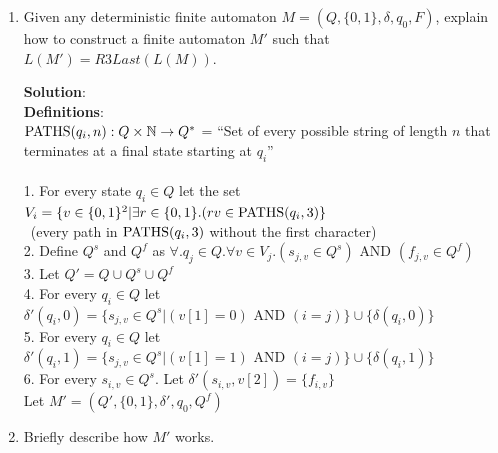\documentclass[11pt]{article}
\def\nats {{\mathbb N}}
\newcommand{\And}{\mbox{ AND }}
\begin{document}
\begin{enumerate}
\item
\begin{question}
Given any deterministic finite automaton $M=(Q,\{0,1\},\delta, q_0,F)$, explain how to construct
a finite automaton $M'$ such that $L(M') = R3Last(L(M))$.
\end{question}

\begin{solution}
{\bf Solution}:\\
{\bf Definitions}:\\
${\rm PATHS}(q_i, n): Q\times\nats\rightarrow Q^* $ = ``Set of every possible string of length $n$ that terminates at a final state starting at $q_i$''\\\\
1. For every state $q_i\in Q$ let the set $V_i=\{v\in \{0,1\}^2|\exists r\in \{0,1\}.(rv\in {\rm PATHS}(q_i, 3)\} $ \\
\null\quad  \ (every path in ${\rm PATHS}(q_i, 3)$ without the first character)\\
2. Define $Q^{s}$ and $Q^{f}$ as $\forall.q_j\in Q.\forall v\in V_j. (s_{j, v}\in Q^{s})\And(f_{j, v}\in Q^{f})$\\
3. Let $Q' = Q \cup Q^{s} \cup Q^{f}$\\
4. For every $q_i\in Q$ let $\delta'(q_i, 0)=\{s_{j,v}\in Q^{s}| (v[1] = 0) \And (i =j)\}\cup\{\delta(q_i, 0)\}$\\
5. For every $q_i\in Q$ let $\delta'(q_i, 1)=\{s_{j,v}\in Q^{s}| (v[1] = 1) \And (i =j)\}\cup\{\delta(q_i, 1)\}$\\
6. For every $s_{i,v}\in Q^{s}$. Let $\delta'(s_{i,v}, v[2]) = \{f_{i,v}\}$\\
Let $M' = (Q', \{0,1\}, \delta', q_0, Q^f)$
\end{solution}

\item
\begin{question}
Briefly describe how $M'$ works.\\\\
\end{question}


\end{enumerate}
\end{document}
